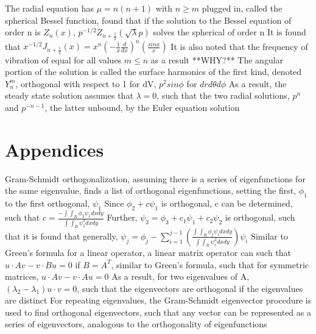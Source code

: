 \documentclass[11 pt, twoside]{article}
\newenvironment{outline*}
{
	\begin{outline}[enumerate]
	}
	{\end{outline}
}
\begin{document}
\begin{outline*}
	\2 The radial equation has $\mu = n(n + 1)$ with $n \geq m$ plugged in, called the spherical Bessel function, found that if the solution to the Bessel equation of order n is $Z_n(x)$, $p^{-1/2}Z_{n + \frac{1}{2}}(\sqrt{\lambda}p)$ solves the spherical of order n
		\3 It is found that $x^{-1/2}J_{n + \frac{1}{2}}(x) = x^n(-\frac{1}{x}\frac{d}{dx})^n(\frac{sinx}{x})$
		\3 It is also noted that the frequency of vibration of equal for all values $m \leq n$ as a result **WHY?**
	\2 The angular portion of the solution is called the surface harmonics of the first kind, denoted $Y^m_n$, orthogonal with respect to 1 for dV, $p^2sin\phi$ for $drd\theta d\phi$
	\2 As a result, the steady state solution assumes that $\lambda = 0$, such that the two radial solutions, $p^n$ and $p^{-n-1}$, the latter unbound, by the Euler equation solution
\end{outline*}
\section{Appendices}
\begin{outline*}
\1 Gram-Schmidt orthogonalization, assuming there is a series of eigenfunctions for the same eigenvalue, finds a list of orthogonal eigenfunctions, setting the first, $\phi_1$ to the first orthogonal, $\psi_1$
	\2 Since $\phi_2 + c\psi_1$ is orthogonal, c can be determined, such that $c = \frac{-\int \int_R \phi_2 \psi_1 dxdy}{\int \int_R \psi_1^2 dxdy}$
	\2 Further, $\psi_3 = \phi_3 + c_1\psi_1 + c_2\psi_2$ is orthogonal, such that it is found that generally, $\psi_j = \phi_j - \sum_{i = 1}^{j - 1} (\frac{\int\int_R \phi_j \psi_i dxdy}{\int\int_R \psi_i^2 dxdy})\psi_i$
\1 Similar to Green's formula for a linear operator, a linear matrix operator can such that $u \cdot Av - v \cdot Bu = 0$ if $B = A^T$, similar to Green's formula, such that for symmetric matrices, $u \cdot Av - v \cdot Au = 0$
	\2 As a result, for two eigenvalues of A, $(\lambda_2 - \lambda_1) u \cdot v = 0$, such that the eigenvectors are orthogonal if the eigenvalues are distinct
	\2 For repeating eigenvalues, the Gram-Schmidt eigenvector procedure is used to find orthogonal eigenvectors, such that any vector can be represented as a series of eigenvectors, analogous to the orthogonality of eigenfunctions
\end{outline*}
\end{document}
